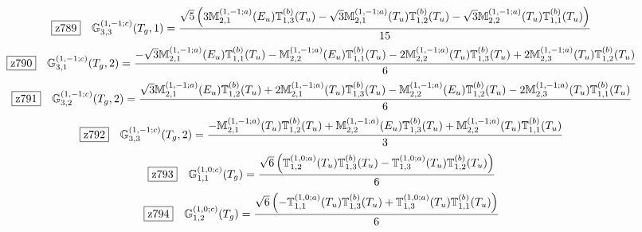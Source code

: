 \documentclass[fleqn,10pt,landscape]{jsarticle}
\begin{document}
\begin{dmath*}
\hspace*{3mm}\fbox{z789}\quad \mathbb{G}_{3,3}^{(1,-1;c)}(T_{g},1)=\frac{\sqrt{5} \left(3 \mathbb{M}_{2,1}^{(1,-1;a)}(E_{u}) \mathbb{T}_{1,3}^{(b)}(T_{u}) - \sqrt{3} \mathbb{M}_{2,1}^{(1,-1;a)}(T_{u}) \mathbb{T}_{1,2}^{(b)}(T_{u}) - \sqrt{3} \mathbb{M}_{2,2}^{(1,-1;a)}(T_{u}) \mathbb{T}_{1,1}^{(b)}(T_{u})\right)}{15}
\end{dmath*}
\begin{dmath*}
\hspace*{3mm}\fbox{z790}\quad \mathbb{G}_{3,1}^{(1,-1;c)}(T_{g},2)=\frac{- \sqrt{3} \mathbb{M}_{2,1}^{(1,-1;a)}(E_{u}) \mathbb{T}_{1,1}^{(b)}(T_{u}) - \mathbb{M}_{2,2}^{(1,-1;a)}(E_{u}) \mathbb{T}_{1,1}^{(b)}(T_{u}) - 2 \mathbb{M}_{2,2}^{(1,-1;a)}(T_{u}) \mathbb{T}_{1,3}^{(b)}(T_{u}) + 2 \mathbb{M}_{2,3}^{(1,-1;a)}(T_{u}) \mathbb{T}_{1,2}^{(b)}(T_{u})}{6}
\end{dmath*}
\begin{dmath*}
\hspace*{3mm}\fbox{z791}\quad \mathbb{G}_{3,2}^{(1,-1;c)}(T_{g},2)=\frac{\sqrt{3} \mathbb{M}_{2,1}^{(1,-1;a)}(E_{u}) \mathbb{T}_{1,2}^{(b)}(T_{u}) + 2 \mathbb{M}_{2,1}^{(1,-1;a)}(T_{u}) \mathbb{T}_{1,3}^{(b)}(T_{u}) - \mathbb{M}_{2,2}^{(1,-1;a)}(E_{u}) \mathbb{T}_{1,2}^{(b)}(T_{u}) - 2 \mathbb{M}_{2,3}^{(1,-1;a)}(T_{u}) \mathbb{T}_{1,1}^{(b)}(T_{u})}{6}
\end{dmath*}
\begin{dmath*}
\hspace*{3mm}\fbox{z792}\quad \mathbb{G}_{3,3}^{(1,-1;c)}(T_{g},2)=\frac{- \mathbb{M}_{2,1}^{(1,-1;a)}(T_{u}) \mathbb{T}_{1,2}^{(b)}(T_{u}) + \mathbb{M}_{2,2}^{(1,-1;a)}(E_{u}) \mathbb{T}_{1,3}^{(b)}(T_{u}) + \mathbb{M}_{2,2}^{(1,-1;a)}(T_{u}) \mathbb{T}_{1,1}^{(b)}(T_{u})}{3}
\end{dmath*}
\begin{dmath*}
\hspace*{3mm}\fbox{z793}\quad \mathbb{G}_{1,1}^{(1,0;c)}(T_{g})=\frac{\sqrt{6} \left(\mathbb{T}_{1,2}^{(1,0;a)}(T_{u}) \mathbb{T}_{1,3}^{(b)}(T_{u}) - \mathbb{T}_{1,3}^{(1,0;a)}(T_{u}) \mathbb{T}_{1,2}^{(b)}(T_{u})\right)}{6}
\end{dmath*}
\begin{dmath*}
\hspace*{3mm}\fbox{z794}\quad \mathbb{G}_{1,2}^{(1,0;c)}(T_{g})=\frac{\sqrt{6} \left(- \mathbb{T}_{1,1}^{(1,0;a)}(T_{u}) \mathbb{T}_{1,3}^{(b)}(T_{u}) + \mathbb{T}_{1,3}^{(1,0;a)}(T_{u}) \mathbb{T}_{1,1}^{(b)}(T_{u})\right)}{6}
\end{dmath*}
\end{document}

